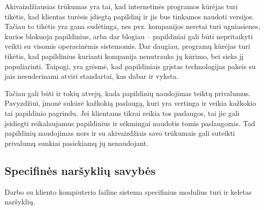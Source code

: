 \documentclass[12pt,a4paper,titlepage]{article}
\begin{document}
Akivaizdžiausias trūkumas yra tai, kad internetinės programos kūrėjas turi tikėtis, kad klientas turėsis įdiegtą papildinį ir jis bus tinkamos naudoti versijos. Tačiau to tikėtis yra gana sudėtinga, nes pvz. kompanijos neretai turi ugniasienes, kurios blokuoja papildinius, arba dar blogiau – papildiniai gali būti nepritaikyti veikti su visomis operacinėmis sistemomis. Dar daugiau, programų kūrėjas turi tikėtis, kad papildinius kurianti kompanija nenutrauks jų kūrimo, bei sieks jį populiarinti. Taipogi, yra grėsmė, kad papildiniais grįstas technologijas pakeis su jais nesuderinami atviri standartai, kas dabar ir vyksta.

Tačiau gali būti ir tokių atvejų, kada papildinių naudojimas teiktų privalumus. Pavyzdžiui, įmonė sukūrė kažkokią paslaugą, kuri yra vertinga ir veikia kažkokio tai papildinio pagrindu. Jei klientams tikrai reikia tos paslaugos, tai jie gali įsidiegti reikalaujamus papildinius ir sėkmingai naudotis tomis paslaugomis. Tad papildinių naudojimas nors ir su akivaizdžiais savo trūkumais gali suteikti privalumų sunkiai pasiekiamų jų nenaudojant.

\subsection{Specifinės naršyklių savybės}

Darbo su kliento kompiuterio failine sistema specifinius modulius turi ir keletas naršyklių. 
\newpage
\end{document}
